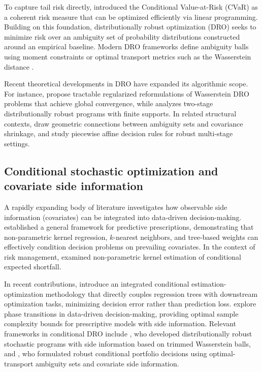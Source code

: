\documentclass[smallextended]{svjour3}
\begin{document}
To capture tail risk directly, \citet{rockafellar2000optimization, rockafellar2002conditional} introduced the Conditional Value-at-Risk (CVaR) as a coherent risk measure that can be optimized efficiently via linear programming. Building on this foundation, distributionally robust optimization (DRO) seeks to minimize risk over an ambiguity set of probability distributions constructed around an empirical baseline. Modern DRO frameworks define ambiguity balls using moment constraints \citep{delage2010distributionally} or optimal transport metrics such as the Wasserstein distance \citep{esfahani2018data}.

Recent theoretical developments in DRO have expanded its algorithmic scope. For instance, \citet{chu2026wasserstein} propose tractable regularized reformulations of Wasserstein DRO problems that achieve global convergence, while \citet{agra2025two} analyzes two-stage distributionally robust programs with finite supports. In related structural contexts, \citet{yue2026geometric} draw geometric connections between ambiguity sets and covariance shrinkage, and \citet{thoma2026piecewise} study piecewise affine decision rules for robust multi-stage settings.

\subsection{Conditional stochastic optimization and covariate side information}
A rapidly expanding body of literature investigates how observable side information (covariates) can be integrated into data-driven decision-making. \citet{bertsimas2020predictive} established a general framework for predictive prescriptions, demonstrating that non-parametric kernel regression, $k$-nearest neighbors, and tree-based weights can effectively condition decision problems on prevailing covariates. In the context of risk management, \citet{scaillet2004nonparametric} examined non-parametric kernel estimation of conditional expected shortfall.

In recent contributions, \citet{qi2025integrated} introduce an integrated conditional estimation-optimization methodology that directly couples regression trees with downstream optimization tasks, minimizing decision error rather than prediction loss. \citet{bennouna2025learning} explore phase transitions in data-driven decision-making, providing optimal sample complexity bounds for prescriptive models with side information. Relevant frameworks in conditional DRO include
\citet{esteban2022distributionally}, who developed distributionally robust
stochastic programs with side information based on trimmed Wasserstein
balls, and \citet{nguyen2021robustifying}, who formulated robust conditional
portfolio decisions using optimal-transport ambiguity sets and covariate
side information.
\end{document}

